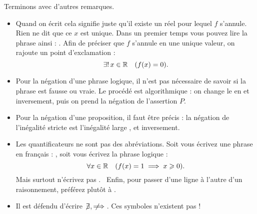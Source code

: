 \documentclass[11pt,class=report,crop=false]{standalone}
\begin{document}
Terminons avec d'autres remarques.
\begin{itemize}

  \item Quand on écrit  cela signifie juste qu'il existe un réel
pour lequel $f$ s'annule. Rien ne dit que ce $x$ est unique. Dans un premier temps vous pouvez
lire la phrase ainsi : .
Afin de préciser que $f$ s'annule en une unique valeur, on rajoute un point d'exclamation :
$$\exists \mathbf{!}\, x \in \mathbb{R} \quad (f(x)=0).$$

  \item Pour la négation d'une phrase logique, il n'est pas nécessaire de savoir si la phrase est fausse
ou vraie. Le procédé est algorithmique : on change le   en
  et inversement, puis on prend la négation de l'assertion $P$.

  \item Pour la négation d'une proposition, il faut être précis : la négation de l'inégalité stricte \assertion{$<$}
est l'inégalité large \assertion{$\ge$}, et inversement.

  \item Les quantificateurs ne sont pas des abréviations. Soit vous écrivez une phrase en français :
 , soit vous écrivez la phrase logique :
$$\forall x \in \mathbb{R} \quad (f(x)=1 \implies x \geqslant 0).$$
Mais surtout n'écrivez pas . \
Enfin, pour passer d'une ligne à l'autre d'un raisonnement, préférez plutôt  à \assertion{$\implies$}.

  \item Il est défendu d'écrire $\not\!\exists$, $\not\!\!\!\implies$. Ces symboles n'existent pas !
\end{itemize}



\end{document}
